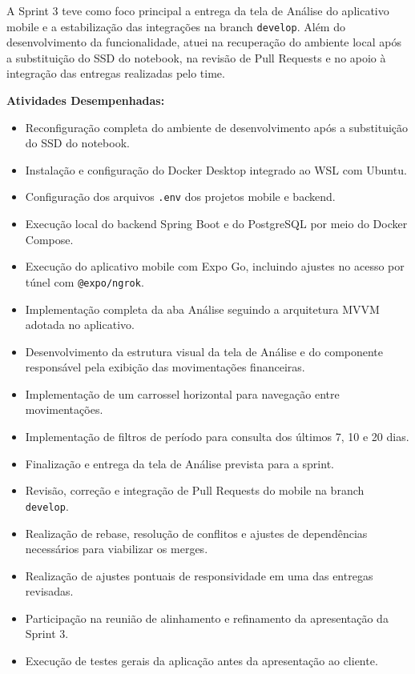 A Sprint 3 teve como foco principal a entrega da tela de Análise do aplicativo
mobile e a estabilização das integrações na branch \texttt{develop}. Além do
desenvolvimento da funcionalidade, atuei na recuperação do ambiente local após
a substituição do SSD do notebook, na revisão de Pull Requests e no apoio à
integração das entregas realizadas pelo time.

\textbf{Atividades Desempenhadas:}

\begin{itemize}
\item
  Reconfiguração completa do ambiente de desenvolvimento após a substituição do
  SSD do notebook.
\item
  Instalação e configuração do Docker Desktop integrado ao WSL com Ubuntu.
\item
  Configuração dos arquivos \texttt{.env} dos projetos mobile e backend.
\item
  Execução local do backend Spring Boot e do PostgreSQL por meio do Docker
  Compose.
\item
  Execução do aplicativo mobile com Expo Go, incluindo ajustes no acesso por
  túnel com \texttt{@expo/ngrok}.
\item
  Implementação completa da aba Análise seguindo a arquitetura MVVM adotada no
  aplicativo.
\item
  Desenvolvimento da estrutura visual da tela de Análise e do componente
  responsável pela exibição das movimentações financeiras.
\item
  Implementação de um carrossel horizontal para navegação entre movimentações.
\item
  Implementação de filtros de período para consulta dos últimos 7, 10 e 20
  dias.
\item
  Finalização e entrega da tela de Análise prevista para a sprint.
\item
  Revisão, correção e integração de Pull Requests do mobile na branch
  \texttt{develop}.
\item
  Realização de rebase, resolução de conflitos e ajustes de dependências
  necessários para viabilizar os merges.
\item
  Realização de ajustes pontuais de responsividade em uma das entregas
  revisadas.
\item
  Participação na reunião de alinhamento e refinamento da apresentação da
  Sprint 3.
\item
  Execução de testes gerais da aplicação antes da apresentação ao cliente.
\end{itemize}


